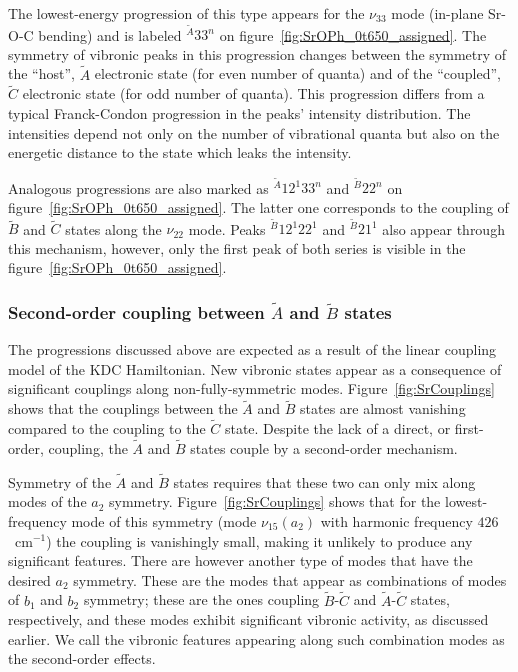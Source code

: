 \documentclass{article}
\begin{document}
The lowest-energy progression of this type appears for the $\nu _{33}$ mode
(in-plane Sr-O-C bending) and is labeled $^{\tilde{A}}33^n$ on
figure~\ref{fig:SrOPh_0t650_assigned}. The symmetry of vibronic peaks in this
progression changes between the symmetry of the ``host'', $\tilde{A}$
electronic state (for even number of quanta) and of the ``coupled'',
$\tilde{C}$ electronic state (for odd number of quanta). This progression
differs from a typical Franck-Condon progression in the peaks' intensity
distribution. The intensities depend not only on the number of vibrational
quanta but also on the energetic distance to the state which leaks the
intensity.

Analogous progressions are also marked as $^{\tilde{A}} 12 ^1 33 ^n$ and
$^{\tilde{B}}22 ^n$ on figure~\ref{fig:SrOPh_0t650_assigned}. The latter one
corresponds to the coupling of $\tilde{B}$ and $\tilde{C}$ states along the
$\nu _{22}$ mode. Peaks $^{\tilde{B}}12^1 22^1$ and $^{\tilde{B}}21 ^1$ also
appear through this mechanism, however, only the first peak of both series is
visible in the figure~\ref{fig:SrOPh_0t650_assigned}.

\subsubsection{Second-order coupling between $\tilde{A}$ and $\tilde{B}$
states} 
\label{sec:results:simulations:2nd}

The progressions discussed above are expected as a result of the linear
coupling model of the KDC Hamiltonian. New vibronic states appear as a
consequence of significant couplings along non-fully-symmetric modes.
Figure~\ref{fig:SrCouplings} shows that the couplings between the $\tilde{A}$
and $\tilde{B}$ states are almost vanishing compared to the coupling to the
$\tilde{C}$ state. Despite the lack of a direct, or first-order, coupling, the
$\tilde{A}$ and $\tilde{B}$ states couple by a second-order mechanism. 

Symmetry of the $\tilde{A}$ and $\tilde{B}$ states requires that these two can
only mix along modes of the $a _2$ symmetry. Figure~\ref{fig:SrCouplings} shows
that for the lowest-frequency mode of this symmetry (mode $\nu _{15} (a_2)$
with harmonic frequency $426$~cm$^{-1}$) the coupling is vanishingly small,
making it unlikely to produce any significant features. There are however
another type of modes that have the desired $a _2$ symmetry. These are the
modes that appear as combinations of modes of $b _1$ and $b _2$ symmetry; these
are the ones coupling $\tilde{B}$-$\tilde{C}$ and $\tilde{A}$-$\tilde{C}$
states, respectively, and these modes exhibit significant vibronic activity, as
discussed earlier. We call the vibronic features appearing along such
combination modes as the second-order effects.
\end{document}
